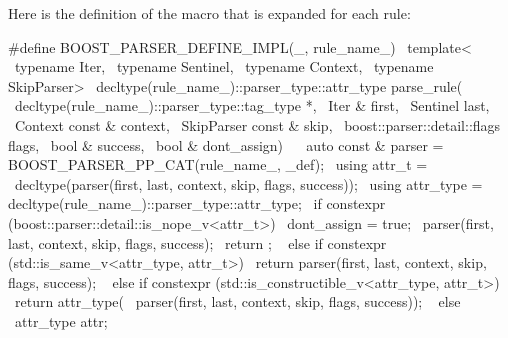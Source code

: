 \documentclass{MyBook}
\begin{document}
Here is the definition of the macro that is expanded for each rule:

\begin{code}
#define BOOST_PARSER_DEFINE_IMPL(_, rule_name_)                                \
    template<                                                                  \
        typename Iter,                                                         \
        typename Sentinel,                                                     \
        typename Context,                                                      \
        typename SkipParser>                                                   \
    decltype(rule_name_)::parser_type::attr_type parse_rule(                   \
        decltype(rule_name_)::parser_type::tag_type *,                         \
        Iter & first,                                                          \
        Sentinel last,                                                         \
        Context const & context,                                               \
        SkipParser const & skip,                                               \
        boost::parser::detail::flags flags,                                    \
        bool & success,                                                        \
        bool & dont_assign)                                                    \
    {                                                                          \
        auto const & parser = BOOST_PARSER_PP_CAT(rule_name_, _def);           \
        using attr_t =                                                         \
            decltype(parser(first, last, context, skip, flags, success));      \
        using attr_type = decltype(rule_name_)::parser_type::attr_type;        \
        if constexpr (boost::parser::detail::is_nope_v<attr_t>) {              \
            dont_assign = true;                                                \
            parser(first, last, context, skip, flags, success);                \
            return {};                                                         \
        } else if constexpr (std::is_same_v<attr_type, attr_t>) {              \
            return parser(first, last, context, skip, flags, success);         \
        } else if constexpr (std::is_constructible_v<attr_type, attr_t>) {     \
            return attr_type(                                                  \
                parser(first, last, context, skip, flags, success));           \
        } else {                                                               \
            attr_type attr{};                                                  \
}}
\end{code}
\end{document}
